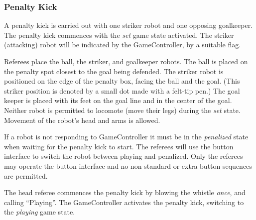 \documentclass[12pt]{article}
\newcommand{\ie}{\mbox{i.\,e.}\xspace}
\newcommand{\eg}{\mbox{e.\,g.}\xspace}
\begin{document}

\subsubsection{Penalty Kick}
\label{sec:penalty_kick}

A penalty kick is carried out with one striker robot and one opposing goalkeeper.
The penalty kick commences with the \textit{set} game state activated.
The striker (attacking) robot will be indicated by the GameController, by a suitable flag.

Referees place the ball, the striker, and goalkeeper robots. The ball is placed on the penalty spot closest to the goal being defended. The striker robot is positioned on the edge of the penalty box, facing the ball and the goal. (This striker position is denoted by a small dot made with a felt-tip pen.) The goal keeper is placed with its feet on the goal line and in the center of the goal.
Neither robot is permitted to locomote (move their legs) during the \textit{set} state. Movement of the robot's head and arms is allowed. 

If a robot is not responding to GameController it must be in the \emph{penalized} state when waiting for the penalty kick to start.
The referees will use the button interface to switch the robot between playing and penalized.
Only the referees may operate the button interface and no non-standard or extra button sequences are permitted.

The head referee commences the penalty kick by blowing the whistle \textit{once}, and calling ``Playing''.
The GameController activates the penalty kick, switching to the \emph{playing} game state.
\end{document}
